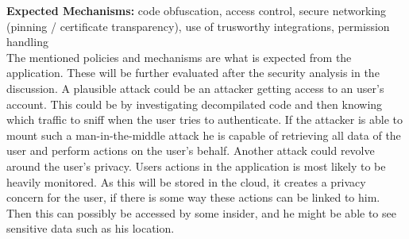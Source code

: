 \noindent\textbf{Expected Mechanisms:} code obfuscation, access control, secure networking (pinning / certificate transparency), use of trusworthy integrations, permission handling\\

The mentioned policies and mechanisms are what is expected from the application. These will be further evaluated after the security analysis in the discussion. A plausible attack could be an attacker getting access to an user's account. This could be by investigating decompilated code and then knowing which traffic to sniff when the user tries to authenticate. If the attacker is able to mount such a man-in-the-middle attack he is capable of retrieving all data of the user and perform actions on the user's behalf. Another attack could revolve around the user's privacy. Users actions in the application is most likely to be heavily monitored. As this will be stored in the cloud, it creates a privacy concern for the user, if there is some way these actions can be linked to him. Then this can possibly be accessed by some insider, and he might be able to see sensitive data such as his location.      
